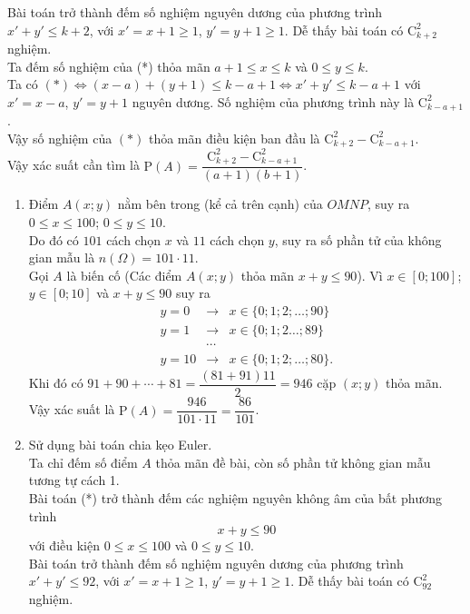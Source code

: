 \begin{vd}
{\begin{tongquat}
\begin{enumerate}
				Bài toán trở thành đếm số nghiệm nguyên dương của phương trình $x'+y'\leq k+2$, với $x'=x+1\geq 1$, $y'=y+1\geq 1$. Dễ thấy bài toán có $\mathrm{C}_{k+2}^2$ nghiệm.\\
				Ta đếm số nghiệm của (*) thỏa mãn $a+1\leq x\leq k$ và $0\leq y\leq k$. \\
				Ta có $(*)\Leftrightarrow (x-a)+(y+1)\leq k-a+1\Leftrightarrow x'+y'\leq k-a+1$ với $x'=x-a$, $y'=y+1$ nguyên dương. Số nghiệm của phương trình này là $\mathrm{C}_{k-a+1}^2$.\\
				Vậy số nghiệm của $(*)$ thỏa mãn điều kiện ban đầu là $\mathrm{C}_{k+2}^2-\mathrm{C}_{k-a+1}^2$.\\
				Vậy xác suất cần tìm là $\mathrm{P}(A)=\dfrac{\mathrm{C}_{k+2}^2-\mathrm{C}_{k-a+1}^2}{(a+1)(b+1)}$.
			\end{enumerate}
		\end{tongquat}
		\noindent
		\begin{enumerate}
			\item[Cách 1.] Điểm $A(x;y)$ nằm bên trong (kể cả trên cạnh) của $OMNP$, suy ra $0\leq x\leq 100$; $0\leq y\leq 10$.\\
			Do đó có $101$ cách chọn $x$ và $11$ cách chọn $y$, suy ra số phần tử của không gian mẫu là $n(\Omega)=101\cdot 11$.\\
			Gọi $A$ là biến cố (Các điểm $A(x;y)$ thỏa mãn $x+y\leq 90$). Vì $x\in[0;100]$; $y\in[0;10]$ và $x+y\leq 90$ suy ra
			\begin{eqnarray*}
				y=0&\rightarrow&x\in\{0;1;2;\ldots;90\}\\
				y=1&\rightarrow&x\in\{0;1;2\ldots;89\}\\
				&\cdots&\\
				y=10&\rightarrow&x\in\{0;1;2;\ldots;80\}.
			\end{eqnarray*}
			Khi đó có $91+90+\cdots+81=\dfrac{(81+91)11}{2}=946$ cặp $(x;y)$ thỏa mãn.\\
			Vậy xác suất là $\mathrm{P}(A)=\dfrac{946}{101\cdot 11}=\dfrac{86}{101}$.
			\item[Cách 2.] Sử dụng bài toán chia kẹo Euler.\\
			Ta chỉ đếm số điểm $A$ thỏa mãn đề bài, còn số phần tử không gian mẫu tương tự cách 1.\\
			Bài toán (*) trở thành đếm các nghiệm nguyên không âm của bất phương trình \[x+y\leq 90\tag{*}\] với điều kiện $0\leq x\leq 100$ và $0\leq y\leq 10$.\\
			Bài toán trở thành đếm số nghiệm nguyên dương của phương trình $x'+y'\leq 92$, với $x'=x+1\geq 1$, $y'=y+1\geq 1$. Dễ thấy bài toán có $\mathrm{C}_{92}^2$ nghiệm.\\

\end{enumerate}}
\end{vd}
